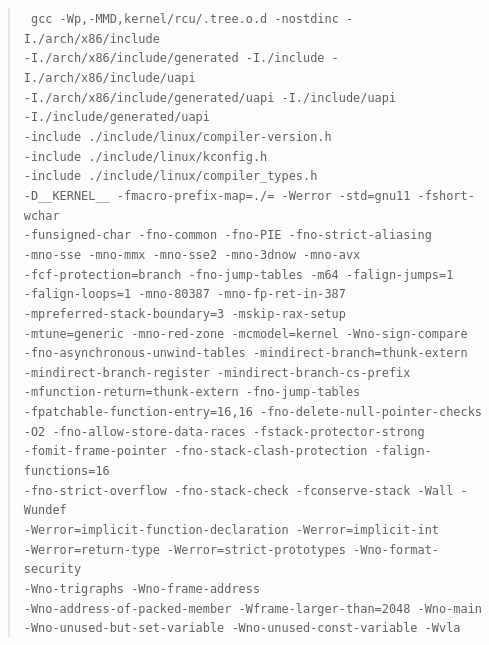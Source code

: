 \documentclass[10]{article}
\begin{document}
\begin{quote}
{
	\scriptsize
	\texttt{\noindent
	gcc -Wp,-MMD,kernel/rcu/.tree.o.d -nostdinc
	-I./arch/x86/include \\
	-I./arch/x86/include/generated  -I./include
	-I./arch/x86/include/uapi \\
	-I./arch/x86/include/generated/uapi
	-I./include/uapi \\
	-I./include/generated/uapi \\
	-include ./include/linux/compiler-version.h \\
	-include ./include/linux/kconfig.h \\
	-include ./include/linux/compiler\_types.h \\
	-D\_\_KERNEL\_\_
	-fmacro-prefix-map=./=
	-Werror -std=gnu11 -fshort-wchar \\
	-funsigned-char -fno-common -fno-PIE
	-fno-strict-aliasing \\
	-mno-sse
	-mno-mmx -mno-sse2 -mno-3dnow -mno-avx \\
	-fcf-protection=branch
	-fno-jump-tables -m64 -falign-jumps=1 \\
	-falign-loops=1 -mno-80387 -mno-fp-ret-in-387 \\
	-mpreferred-stack-boundary=3 -mskip-rax-setup \\
	-mtune=generic -mno-red-zone -mcmodel=kernel
	-Wno-sign-compare \\
	-fno-asynchronous-unwind-tables
	-mindirect-branch=thunk-extern \\
	-mindirect-branch-register
	-mindirect-branch-cs-prefix \\
	-mfunction-return=thunk-extern -fno-jump-tables \\
	-fpatchable-function-entry=16,16
	-fno-delete-null-pointer-checks \\
	-O2 -fno-allow-store-data-races
	-fstack-protector-strong \\
	-fomit-frame-pointer
	-fno-stack-clash-protection -falign-functions=16 \\
	-fno-strict-overflow -fno-stack-check -fconserve-stack
	-Wall -Wundef \\
	-Werror=implicit-function-declaration
	-Werror=implicit-int \\
	-Werror=return-type
	-Werror=strict-prototypes -Wno-format-security \\
	-Wno-trigraphs -Wno-frame-address \\
	-Wno-address-of-packed-member
	-Wframe-larger-than=2048 -Wno-main \\
	-Wno-unused-but-set-variable -Wno-unused-const-variable -Wvla \\
}}
\end{quote}
\end{document}
